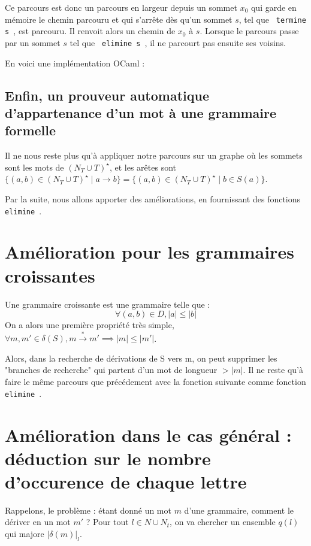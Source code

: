 \documentclass[a4paper,12pt]{article}
\newcommand{\norm}[1]{\lvert #1 \rvert}
\begin{document}
Ce parcours est donc un parcours en largeur depuis un sommet $x_0$ qui garde en mémoire le chemin parcouru et qui s'arrête dès qu'un 
sommet $s$, tel que \texttt{ termine s }, est parcouru. Il renvoit alors un chemin de $x_0$ à $s$. Lorsque le parcours passe par un sommet $s$ tel que \texttt{ elimine s }, 
il ne parcourt pas ensuite ses voisins.

En voici une implémentation OCaml :


\subsection{Enfin, un prouveur automatique d'appartenance d'un mot à une grammaire formelle}

Il ne nous reste plus qu'à appliquer notre parcours sur un graphe où les sommets sont les mots de $(N_T \cup T)^\star$, et les
arêtes sont $\{(a,b) \in  (N_T \cup T)^\star \mid a \rightarrow b\} = \{(a,b) \in  (N_T \cup T)^\star \mid b \in S(a)\}$.


Par la suite, nous allons apporter des améliorations, en fournissant des fonctions \texttt{ elimine }.

\section{Amélioration pour les grammaires croissantes}

Une grammaire croissante est une grammaire telle que :
\begin{equation}\forall (a,b) \in D, \norm{a} \leq \norm{b} \end{equation}
On a alors une première propriété très simple, $\forall m, m' \in \delta (S), m \overset{*}{\rightarrow} m' \implies \norm{m} \leq \norm{m'}$.

Alors, dans la recherche de dérivations de S vers m, on peut supprimer les "branches de recherche" qui partent d'un mot de longueur $> \norm{m}$.
Il ne reste qu'à faire le même parcours que précédement avec la fonction suivante comme fonction \texttt{ elimine }.

\section{Amélioration dans le cas général : déduction sur le nombre d'occurence de chaque lettre}
Rappelons, le problème : étant donné un mot $m$ d'une grammaire, comment le dériver en un mot $m'$ ?
Pour tout $l \in N\cup N_t$, on va chercher un ensemble $q(l)$ qui majore $\norm{\delta(m)}_l$.
\end{document}
